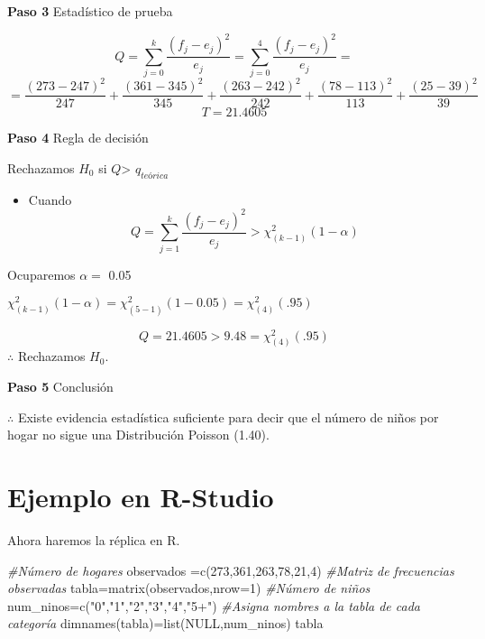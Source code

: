 \documentclass[
  a4paper,
  oneside,
  openany]{book}
\newenvironment{Shaded}{\begin{snugshade}}{\end{snugshade}}
\newcommand{\AttributeTok}[1]{\textcolor[rgb]{0.77,0.63,0.00}{#1}}
\newcommand{\CommentTok}[1]{\textcolor[rgb]{0.56,0.35,0.01}{\textit{#1}}}
\newcommand{\ConstantTok}[1]{\textcolor[rgb]{0.00,0.00,0.00}{#1}}
\newcommand{\DecValTok}[1]{\textcolor[rgb]{0.00,0.00,0.81}{#1}}
\newcommand{\FunctionTok}[1]{\textcolor[rgb]{0.00,0.00,0.00}{#1}}
\newcommand{\NormalTok}[1]{#1}
\newcommand{\OtherTok}[1]{\textcolor[rgb]{0.56,0.35,0.01}{#1}}
\newcommand{\StringTok}[1]{\textcolor[rgb]{0.31,0.60,0.02}{#1}}
\providecommand{\tightlist}{%
  \setlength{\itemsep}{0pt}\setlength{\parskip}{0pt}}
\begin{document}
\textbf{Paso 3} Estadístico de prueba

\[Q=\sum_{j=0}^{k}\frac{(f_{j}-e_{j})^2}{e_{j}}=\sum_{j=0}^{4}\frac{(f_{j}-e_{j})^2}{e_{j}}=\]
\[=\frac{(273-247)^2}{247}+\frac{(361-345)^2}{345}+\frac{(263-242)^2}{242}+\frac{(78-113)^2}{113}+\frac{(25-39)^2}{39}\]
\[T=21.4605\]

\textbf{Paso 4} Regla de decisión

Rechazamos \(H_0\) si \(Q\)\textgreater{} \(q_{teórica}\)

\begin{itemize}
\tightlist
\item
  Cuando \[Q= \sum_{j=1}^{k}\frac{(f_{j}-e_{j})^2}{e_{j}} > \chi^2_{(k-1)}(1-\alpha)\]
\end{itemize}

Ocuparemos \(\alpha=\) 0.05

\(\chi^2_{(k-1)}(1-\alpha)=\chi^2_{(5-1)}(1-0.05) =\chi^2_{(4)}(.95)\)

\[ Q=21.4605 > 9.48= \chi^2_{(4)}(.95)\]
\(\therefore\) Rechazamos \(H_0\).

\textbf{Paso 5} Conclusión

\(\therefore\) Existe evidencia estadística suficiente para decir que el número de niños por hogar no sigue una Distribución Poisson (1.40).

\hypertarget{ejemplo-en-r-studio-13}{%
\section{Ejemplo en R-Studio}\label{ejemplo-en-r-studio-13}}

Ahora haremos la réplica en R.

\begin{Shaded}
\begin{Highlighting}[]
\CommentTok{\#Número de hogares}
\NormalTok{observados }\OtherTok{=}\FunctionTok{c}\NormalTok{(}\DecValTok{273}\NormalTok{,}\DecValTok{361}\NormalTok{,}\DecValTok{263}\NormalTok{,}\DecValTok{78}\NormalTok{,}\DecValTok{21}\NormalTok{,}\DecValTok{4}\NormalTok{) }
\CommentTok{\#Matriz de frecuencias observadas}
\NormalTok{tabla}\OtherTok{=}\FunctionTok{matrix}\NormalTok{(observados,}\AttributeTok{nrow=}\DecValTok{1}\NormalTok{)}
\CommentTok{\#Número de niños}
\NormalTok{num\_ninos}\OtherTok{=}\FunctionTok{c}\NormalTok{(}\StringTok{"0"}\NormalTok{,}\StringTok{"1"}\NormalTok{,}\StringTok{"2"}\NormalTok{,}\StringTok{"3"}\NormalTok{,}\StringTok{"4"}\NormalTok{,}\StringTok{"5+"}\NormalTok{)}
\CommentTok{\#Asigna nombres a la tabla de cada categoría}
\FunctionTok{dimnames}\NormalTok{(tabla)}\OtherTok{=}\FunctionTok{list}\NormalTok{(}\ConstantTok{NULL}\NormalTok{,num\_ninos)}
\NormalTok{tabla}
\end{Highlighting}
\end{Shaded}
\end{document}
